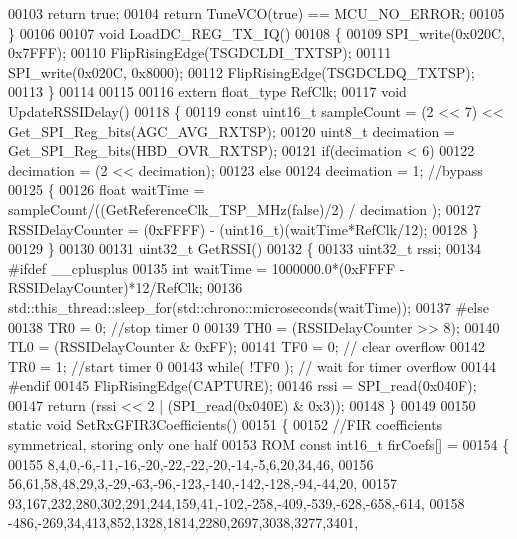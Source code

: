 \begin{DoxyCode}
{00103         \textcolor{keywordflow}{return} \textcolor{keyword}{true};
00104     \textcolor{keywordflow}{return} TuneVCO(\textcolor{keyword}{true}) == MCU_NO_ERROR;
00105 \}
00106 
00107 \textcolor{keywordtype}{void} LoadDC_REG_TX_IQ()
00108 \{
00109     SPI_write(0x020C, 0x7FFF);
00110     FlipRisingEdge(TSGDCLDI_TXTSP);
00111     SPI_write(0x020C, 0x8000);
00112     FlipRisingEdge(TSGDCLDQ_TXTSP);
00113 \}
00114 
00115 
00116 \textcolor{keyword}{extern} float_type RefClk;
00117 \textcolor{keywordtype}{void} UpdateRSSIDelay()
00118 \{
00119     \textcolor{keyword}{const} uint16\_t sampleCount = (2 << 7) << Get_SPI_Reg_bits(AGC_AVG_RXTSP);
00120     uint8\_t decimation = Get_SPI_Reg_bits(HBD_OVR_RXTSP);
00121     \textcolor{keywordflow}{if}(decimation < 6)
00122         decimation = (2 << decimation);
00123     \textcolor{keywordflow}{else}
00124         decimation = 1; \textcolor{comment}{//bypass}
00125     \{
00126     \textcolor{keywordtype}{float} waitTime = sampleCount/((GetReferenceClk_TSP_MHz(\textcolor{keyword}{false})/2) / decimation );
00127     RSSIDelayCounter = (0xFFFF) - (uint16\_t)(waitTime*RefClk/12);
00128     \}
00129 \}
00130 
00131 uint32\_t GetRSSI()
00132 \{
00133     uint32\_t rssi;
00134 \textcolor{preprocessor}{#ifdef \_\_cplusplus}
00135     \textcolor{keywordtype}{int} waitTime = 1000000.0*(0xFFFF - RSSIDelayCounter)*12/RefClk;
00136     std::this\_thread::sleep\_for(std::chrono::microseconds(waitTime));
00137 \textcolor{preprocessor}{#else}
00138     TR0 = 0; \textcolor{comment}{//stop timer 0}
00139     TH0 = (RSSIDelayCounter >> 8);
00140     TL0 = (RSSIDelayCounter & 0xFF);
00141     TF0 = 0; \textcolor{comment}{// clear overflow}
00142     TR0 = 1; \textcolor{comment}{//start timer 0}
00143     \textcolor{keywordflow}{while}( !TF0 ); \textcolor{comment}{// wait for timer overflow}
00144 \textcolor{preprocessor}{#endif}
00145     FlipRisingEdge(CAPTURE);
00146     rssi = SPI_read(0x040F);
00147     \textcolor{keywordflow}{return} (rssi << 2 | (SPI_read(0x040E) & 0x3));
00148 \}
00149 
00150 \textcolor{keyword}{static} \textcolor{keywordtype}{void} SetRxGFIR3Coefficients()
00151 \{
00152     \textcolor{comment}{//FIR coefficients symmetrical, storing only one half}
00153     ROM \textcolor{keyword}{const} int16\_t firCoefs[] =
00154     \{
00155         8,4,0,-6,-11,-16,-20,-22,-22,-20,-14,-5,6,20,34,46,
00156         56,61,58,48,29,3,-29,-63,-96,-123,-140,-142,-128,-94,-44,20,
00157         93,167,232,280,302,291,244,159,41,-102,-258,-409,-539,-628,-658,-614,
00158         -486,-269,34,413,852,1328,1814,2280,2697,3038,3277,3401,
}
\end{DoxyCode}
